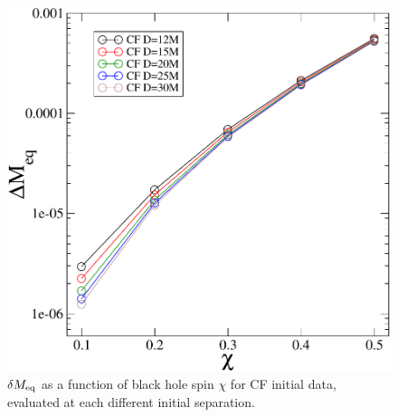 \begin{figure}[!htbp]
\includegraphics[scale=0.95]{chap5/MvsS2}
 \caption{$\delta M_{\rm eq}$ as a function of black hole spin $\chi$ for CF
    initial data, evaluated at each different initial separation.}
  \label{fig:MvsS}
\end{figure}






